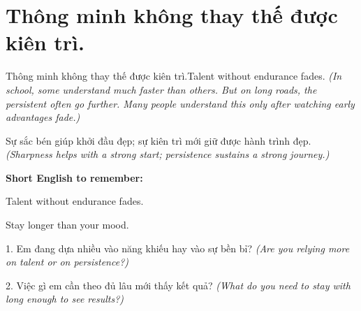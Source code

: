 \section{Thông minh không thay thế được kiên trì.}
\begin{truyen}{Thông minh không thay thế được kiên trì.}{Talent without endurance fades.}
\textit{(In school, some understand much faster than others. But on long roads, the persistent often go further. Many people understand this only after watching early advantages fade.)}
\end{truyen}
\begin{baihoc}
Sự sắc bén giúp khởi đầu đẹp; sự kiên trì mới giữ được hành trình đẹp.
\textit{(Sharpness helps with a strong start; persistence sustains a strong journey.)}
\end{baihoc}
\begin{ghinhoanh}
\textbf{Short English to remember:}

Talent without endurance fades.

Stay longer than your mood.
\end{ghinhoanh}
\begin{tuhocnhanh}
1. Em đang dựa nhiều vào năng khiếu hay vào sự bền bỉ? \textit{(Are you relying more on talent or on persistence?)}

2. Việc gì em cần theo đủ lâu mới thấy kết quả? \textit{(What do you need to stay with long enough to see results?)}
\end{tuhocnhanh}
\ngancach


